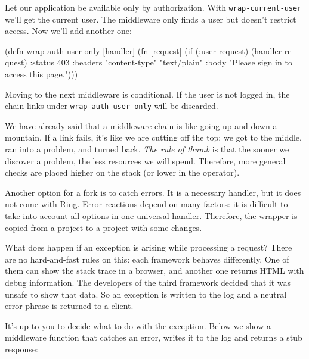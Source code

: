 Let our application be available only by authorization. With \verb|wrap-current-user| we'll get the current user. The middleware only finds a user but doesn't restrict access. Now we'll add another one:


\begin{english}
\begin{clojure}
(defn wrap-auth-user-only [handler]
(fn [request]
(if (:user request)
(handler request)
{:status 403
:headers {"content-type" "text/plain"}
:body "Please sign in to access this page."})))
\end{clojure}
\end{english}

Moving to the next middleware is conditional. If the user is not logged in, the chain links under \verb|wrap-auth-user-only| will be discarded.

We have already said that a middleware chain is like going up and down a mountain. If a link fails, it’s like we are cutting off the top: we got to the middle, ran into a problem, and turned back. \emph{The rule of thumb} is that the sooner we discover a problem, the less resources we will spend. Therefore, more general checks are placed higher on the stack (or lower in the \arr operator).


Another option for a fork is to catch errors. It is a necessary handler, but it does not come with Ring. Error reactions depend on many factors: it is difficult to take into account all options in one universal handler. Therefore, the wrapper is copied from a project to a project with some changes.

What does happen if an exception is arising while processing a request? There are no hard-and-fast rules on this: each framework behaves differently. One of them can show the stack trace in a browser, and another one returns HTML with debug information. The developers of the third framework decided that it was unsafe to show that data. So an exception is written to the log and a neutral error phrase is returned to a client.

It's up to you to decide what to do with the exception. Below we show a middleware function that catches an error, writes it to the log and returns a stub response:


